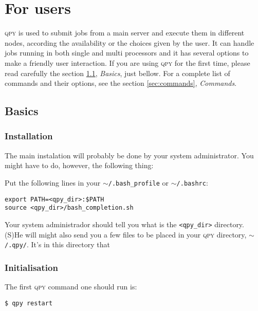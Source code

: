 \documentclass[a4paper,12pt]{article}
\newcommand{\qpy}{\textsc{qpy}}
\begin{document}


\tableofcontents

\newpage
\section{For users}


\qpy{} is used to submit jobs from a main server and execute them in different nodes, according the availability or the choices given by the user.
It can handle jobs running in both single and multi processors and it has several options to make a friendly user interaction.
If you are using \qpy{} for the first time, please read carefully the section \ref{sec:basics}, \emph{Basics}, just bellow.
For a complete list of commands and their options, see the section \ref{sec:commands}, \emph{Commands}.


\subsection{Basics}\label{sec:basics}

\subsubsection{Installation}

The main instalation will probably be done by your system administrator.
You might have to do, however, the following thing:

Put the following lines in your $\sim$\texttt{/.bash\_profile} or $\sim$\texttt{/.bashrc}:


\begin{lstlisting}[style=FileStyle]
export PATH=<qpy_dir>:$PATH
source <qpy_dir>/bash_completion.sh
\end{lstlisting}

Your system administrador should tell you what is the \texttt{<qpy\_dir>} directory.
(S)He will might also send you a few files to be placed in your \qpy{} directory, $\sim$\texttt{/.qpy/}.
It's in this directory that 

\subsubsection{Initialisation}

The first \qpy{} command one should run is:

\begin{lstlisting}[style=BashStyle]
$ qpy restart
\end{lstlisting}
\end{document}
